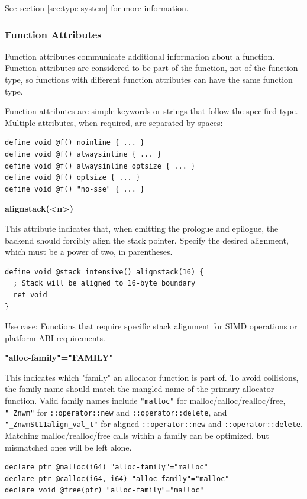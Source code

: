 See section \ref{sec:type-system} for more information.

\subsubsection{Function Attributes}

Function attributes communicate additional information about a function.
Function attributes are considered to be part of the function, not of the function type, so functions with different function attributes can have the same function type.

Function attributes are simple keywords or strings that follow the specified type.
Multiple attributes, when required, are separated by spaces:

\begin{lstlisting}[style=ir]
define void @f() noinline { ... }
define void @f() alwaysinline { ... }
define void @f() alwaysinline optsize { ... }
define void @f() optsize { ... }
define void @f() "no-sse" { ... }
\end{lstlisting}

\textbf{alignstack(<n>)}

This attribute indicates that, when emitting the prologue and epilogue, the backend should forcibly align the stack pointer.
Specify the desired alignment, which must be a power of two, in parentheses.

\begin{lstlisting}[style=ir]
define void @stack_intensive() alignstack(16) {
  ; Stack will be aligned to 16-byte boundary
  ret void
}
\end{lstlisting}

Use case: Functions that require specific stack alignment for SIMD operations or platform ABI requirements.

\textbf{"alloc-family"="FAMILY"}

This indicates which "family" an allocator function is part of.
To avoid collisions, the family name should match the mangled name of the primary allocator function.
Valid family names include \texttt{"malloc"} for malloc/calloc/realloc/free, \texttt{"\_Znwm"} for \texttt{::operator::new} and \texttt{::operator::delete}, and \texttt{"\_ZnwmSt11align\_val\_t"} for aligned \texttt{::operator::new} and \texttt{::operator::delete}.
Matching malloc/realloc/free calls within a family can be optimized, but mismatched ones will be left alone.

\begin{lstlisting}[style=ir]
declare ptr @malloc(i64) "alloc-family"="malloc"
declare ptr @calloc(i64, i64) "alloc-family"="malloc"
declare void @free(ptr) "alloc-family"="malloc"
\end{lstlisting}


